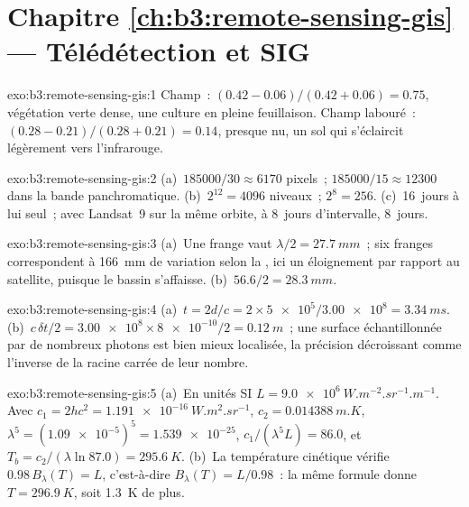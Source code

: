 \section*{Chapitre \ref{ch:b3:remote-sensing-gis} --- Télédétection et SIG}

\begin{solution}{exo:b3:remote-sensing-gis:1}
Champ~: $(0.42 - 0.06)/(0.42 + 0.06) = 0.75$, végétation verte dense, une culture
en pleine feuillaison. Champ labouré~: $(0.28 - 0.21)/(0.28 + 0.21) = 0.14$, presque
nu, un sol qui s'éclaircit légèrement vers l'infrarouge.
\end{solution}

\begin{solution}{exo:b3:remote-sensing-gis:2}
(a)~$185000/30 \approx 6170$ pixels~; $185000/15 \approx 12300$ dans la
bande panchromatique. (b)~$2^{12} = 4096$ niveaux~; $2^8 = 256$. (c)~16~jours
à lui seul~; avec Landsat~9 sur la même orbite, à 8~jours d'intervalle, 8~jours.
\end{solution}

\begin{solution}{exo:b3:remote-sensing-gis:3}
(a)~Une frange vaut $\lambda/2 = \qty{27.7}{mm}$~; six franges correspondent
à \qty{166}{mm} de variation selon la , ici un éloignement par rapport au satellite, puisque
le bassin s'affaisse. (b)~$56.6/2 = \qty{28.3}{mm}$.
\end{solution}

\begin{solution}{exo:b3:remote-sensing-gis:4}
(a)~$t = 2d/c = 2\times\num{5e5}/\num{3.00e8} = \qty{3.34}{ms}$.
(b)~$c\,\delta t/2 = \num{3.00e8}\times\num{8e-10}/2 = \qty{0.12}{m}$~; une
surface échantillonnée par de nombreux photons est bien mieux localisée, la précision
décroissant comme l'inverse de la racine carrée de leur nombre.
\end{solution}

\begin{solution}{exo:b3:remote-sensing-gis:5}
(a)~En unités SI $L = \qty{9.0e6}{W.m^{-2}.sr^{-1}.m^{-1}}$. Avec $c_1 =
2hc^2 = \qty{1.191e-16}{W.m^2.sr^{-1}}$, $c_2 = \qty{0.014388}{m.K}$,
$\lambda^5 = (\num{1.09e-5})^5 = \num{1.539e-25}$, $c_1/(\lambda^5L) = 86.0$,
et $T_b = c_2/(\lambda\ln 87.0) = \qty{295.6}{K}$. (b)~La température cinétique
vérifie $0.98\,B_\lambda(T) = L$, c'est-à-dire $B_\lambda(T) = L/0.98$~: la même
formule donne $T = \qty{296.9}{K}$, soit \qty{1.3}{K} de plus.
\end{solution}

